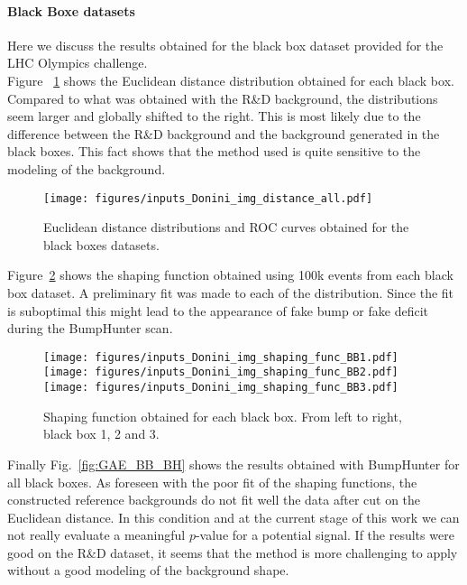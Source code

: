 \documentclass[a4paper,11pt]{article}
\begin{document}
\paragraph{Black Boxe datasets}
\label{sec:BB}

\noindent Here we discuss the results obtained for the black box dataset provided for the LHC Olympics challenge.\\

\noindent Figure ~\ref{fig:GAE_BB_dist} shows the Euclidean distance distribution obtained for each black box.
Compared to what was obtained with the R\&D background, the distributions seem larger and globally shifted to the right.
This is most likely due to the difference between the R\&D background and the background generated in the black boxes.
This fact shows that the method used is quite sensitive to the modeling of the background.

\begin{figure}[h!]
\centering
\texttt{[image: figures/inputs\_Donini\_img\_distance\_all.pdf]}
\caption{Euclidean distance distributions and ROC curves obtained for the black boxes datasets.}
\label{fig:GAE_BB_dist}
\end{figure}

\noindent Figure~\ref{fig:GAE_BB_shape} shows the shaping function obtained using 100k events from each black box dataset. A preliminary fit was made to each of the distribution. Since the fit is suboptimal this might lead to the appearance of fake bump or fake deficit during the BumpHunter scan.

\begin{figure}[h!]
\centering
\texttt{[image: figures/inputs\_Donini\_img\_shaping\_func\_BB1.pdf]}
\texttt{[image: figures/inputs\_Donini\_img\_shaping\_func\_BB2.pdf]}
\texttt{[image: figures/inputs\_Donini\_img\_shaping\_func\_BB3.pdf]}
\caption{Shaping function obtained for each black box.  From left to right, black box 1, 2 and 3.}
\label{fig:GAE_BB_shape}
\end{figure}

\noindent Finally Fig.~\ref{fig:GAE_BB_BH} shows the results obtained with BumpHunter for all black boxes.
As foreseen with the poor fit of the shaping functions, the constructed reference backgrounds do not fit well the data after cut on the Euclidean distance.
In this condition and at the current stage of this work we can not really evaluate a meaningful $p$-value for a potential signal.
If the results were good on the R\&D dataset, it seems that the method is more challenging to apply without a good modeling of the background shape.
\end{document}
